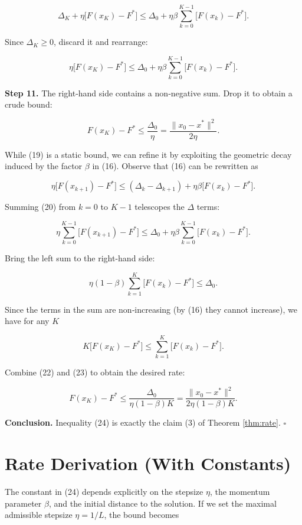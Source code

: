 \documentclass{article}
\begin{document}
\[
\Delta_{K}+ \eta\bigl[F(x_{K})-F^{*}\bigr]
\le \Delta_{0}+ \eta\beta\sum_{k=0}^{K-1}\bigl[F(x_{k})-F^{*}\bigr].
\tag{17}
\]

Since $\Delta_{K}\ge0$, discard it and rearrange:

\[
\eta\bigl[F(x_{K})-F^{*}\bigr]
\le \Delta_{0}+ \eta\beta\sum_{k=0}^{K-1}\bigl[F(x_{k})-F^{*}\bigr].
\tag{18}
\]

\noindent\textbf{Step 11.} The right‑hand side contains a non‑negative sum. Drop it to obtain a crude bound:

\[
F(x_{K})-F^{*}\le \frac{\Delta_{0}}{\eta}= \frac{\|x_{0}-x^{*}\|^{2}}{2\eta}.
\tag{19}
\]

While (19) is a static bound, we can refine it by exploiting the geometric decay induced by the factor $\beta$ in (16). Observe that (16) can be rewritten as  

\[
\eta\bigl[F(x_{k+1})-F^{*}\bigr]
\le (\Delta_{k}-\Delta_{k+1})+\eta\beta\bigl[F(x_{k})-F^{*}\bigr].
\tag{20}
\]

Summing (20) from $k=0$ to $K-1$ telescopes the $\Delta$ terms:

\[
\eta\sum_{k=0}^{K-1}\bigl[F(x_{k+1})-F^{*}\bigr]
\le \Delta_{0}+\eta\beta\sum_{k=0}^{K-1}\bigl[F(x_{k})-F^{*}\bigr].
\tag{21}
\]

Bring the left sum to the right-hand side:

\[
\eta(1-\beta)\sum_{k=1}^{K}\bigl[F(x_{k})-F^{*}\bigr]\le \Delta_{0}.
\tag{22}
\]

Since the terms in the sum are non‑increasing (by (16) they cannot increase), we have for any $K$  

\[
K\bigl[F(x_{K})-F^{*}\bigr]\le \sum_{k=1}^{K}\bigl[F(x_{k})-F^{*}\bigr].
\tag{23}
\]

Combine (22) and (23) to obtain the desired rate:

\[
F(x_{K})-F^{*}\le \frac{\Delta_{0}}{\eta(1-\beta)K}
               =\frac{\|x_{0}-x^{*}\|^{2}}{2\eta(1-\beta)K}.
\tag{24}
\]

\noindent\textbf{Conclusion.} Inequality (24) is exactly the claim (3) of Theorem \ref{thm:rate}. $\square$

\section*{Rate Derivation (With Constants)}
The constant in (24) depends explicitly on the stepsize $\eta$, the momentum parameter $\beta$, and the initial distance to the solution.  
If we set the maximal admissible stepsize $\eta=1/L$, the bound becomes  
\end{document}
